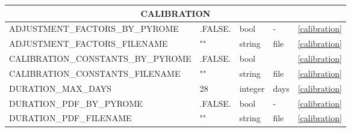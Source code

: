 \begin{landscape}
\begin{center}
\begin{longtable}{lllll}
\multicolumn{5}{c}{CALIBRATION}                                                                                                                                                \\
\toprule
ADJUSTMENT\_FACTORS\_BY\_PYROME              & .FALSE.                    & bool                   & -                                  & \ref{calibration}                    \\
ADJUSTMENT\_FACTORS\_FILENAME                & ""                         & string                 & file                               & \ref{calibration}                    \\
CALIBRATION\_CONSTANTS\_BY\_PYROME           & .FALSE.                    & bool                   &                                    & \ref{calibration}                    \\
CALIBRATION\_CONSTANTS\_FILENAME             & ""                         & string                 & file                               & \ref{calibration}                    \\
DURATION\_MAX\_DAYS                          & 28                         & integer                & days                               & \ref{calibration}                    \\
DURATION\_PDF\_BY\_PYROME                    & .FALSE.                    & bool                   & -                                  & \ref{calibration}                    \\
DURATION\_PDF\_FILENAME                      & ""                         & string                 & file                               & \ref{calibration}                    \\
\end{longtable}
\end{center}
\end{landscape}

